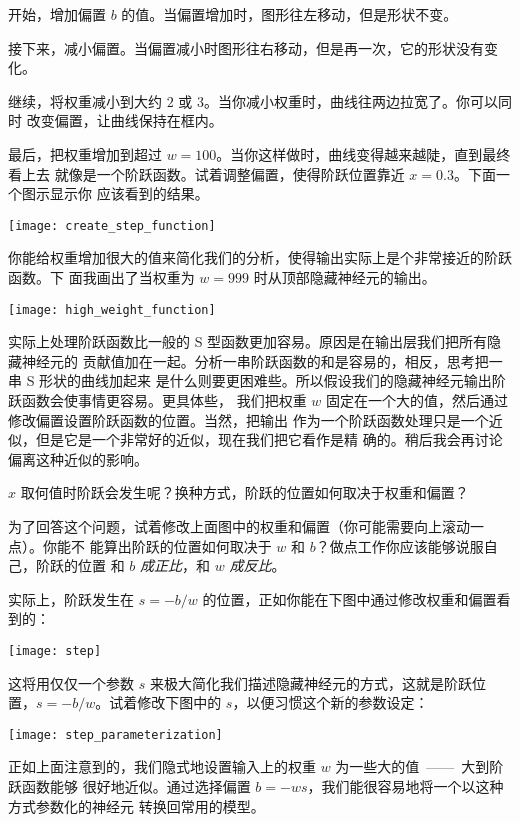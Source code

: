 开始，增加偏置 $b$ 的值。当偏置增加时，图形往左移动，但是形状不变。

接下来，减小偏置。当偏置减小时图形往右移动，但是再一次，它的形状没有变化。

继续，将权重减小到大约 $2$ 或 $3$。当你减小权重时，曲线往两边拉宽了。你可以同时
改变偏置，让曲线保持在框内。

最后，把权重增加到超过 $w = 100$。当你这样做时，曲线变得越来越陡，直到最终看上去
就像是一个阶跃函数。试着调整偏置，使得阶跃位置靠近 $x = 0.3$。下面一个图示显示你
应该看到的结果。
\begin{center}
  \texttt{[image: create\_step\_function]}
\end{center}

你能给权重增加很大的值来简化我们的分析，使得输出实际上是个非常接近的阶跃函数。下
面我画出了当权重为 $w = 999$ 时从顶部隐藏神经元的输出。
\begin{center}
  \texttt{[image: high\_weight\_function]}
\end{center}

实际上处理阶跃函数比一般的 S 型函数更加容易。原因是在输出层我们把所有隐藏神经元的
贡献值加在一起。分析一串阶跃函数的和是容易的，相反，思考把一串 S 形状的曲线加起来
是什么则要更困难些。所以假设我们的隐藏神经元输出阶跃函数会使事情更容易。更具体些，
我们把权重 $w$ 固定在一个大的值，然后通过修改偏置设置阶跃函数的位置。当然，把输出
作为一个阶跃函数处理只是一个近似，但是它是一个非常好的近似，现在我们把它看作是精
确的。稍后我会再讨论偏离这种近似的影响。

$x$ 取何值时阶跃会发生呢？换种方式，阶跃的位置如何取决于权重和偏置？

为了回答这个问题，试着修改上面图中的权重和偏置（你可能需要向上滚动一点）。你能不
能算出阶跃的位置如何取决于 $w$ 和 $b$？做点工作你应该能够说服自己，阶跃的位置
和 $b$ \emph{成正比}，和 $w$ \emph{成反比}。

实际上，阶跃发生在 $s = -b/w$ 的位置，正如你能在下图中通过修改权重和偏置看到的：
\begin{center}
  \texttt{[image: step]}
\end{center}

这将用仅仅一个参数 $s$ 来极大简化我们描述隐藏神经元的方式，这就是阶跃位置，$s =
-b/w$。试着修改下图中的 $s$，以便习惯这个新的参数设定：
\begin{center}
  \texttt{[image: step\_parameterization]}
\end{center}

正如上面注意到的，我们隐式地设置输入上的权重 $w$ 为一些大的值~——~大到阶跃函数能够
很好地近似。通过选择偏置 $b = -ws$，我们能很容易地将一个以这种方式参数化的神经元
转换回常用的模型。

